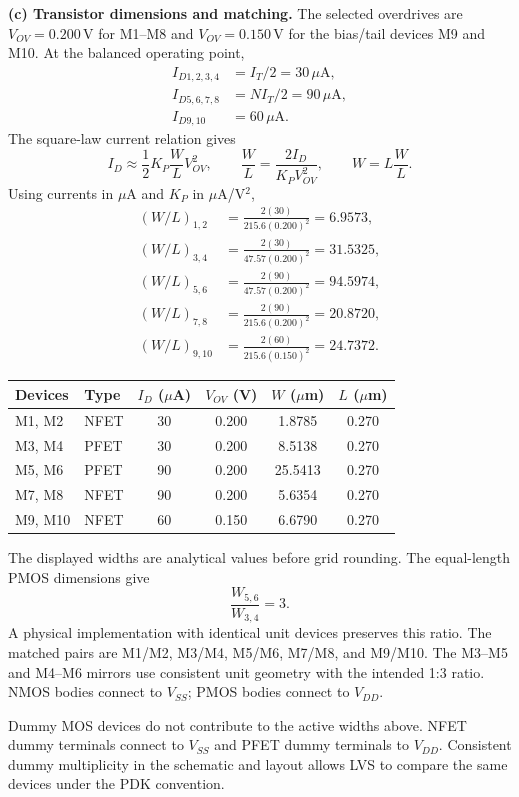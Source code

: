 \documentclass[12pt,letterpaper]{article}
\newcommand{\uA}{\,\mu\mathrm{A}}
\newcommand{\V}{\,\mathrm{V}}
\begin{document}
\begin{enumerate}
\newpage
\textbf{(c) Transistor dimensions and matching.}
The selected overdrives are $V_{OV}=0.200\V$ for M1--M8 and
$V_{OV}=0.150\V$ for the bias/tail devices M9 and M10.
At the balanced operating point,
\begin{align*}
I_{D1,2,3,4}&=I_T/2=30\uA,\\
I_{D5,6,7,8}&=NI_T/2=90\uA,\\
I_{D9,10}&=60\uA.
\end{align*}
The square-law current relation gives
\[
I_D\approx\frac12 K_P\frac WL V_{OV}^2,\qquad
\frac WL=\frac{2I_D}{K_PV_{OV}^2},\qquad W=L\frac WL.
\]
Using currents in $\mu$A and $K_P$ in $\mu$A/V$^2$,
\begin{align*}
(W/L)_{1,2}&=\frac{2(30)}{215.6(0.200)^2}=6.9573,\\
(W/L)_{3,4}&=\frac{2(30)}{47.57(0.200)^2}=31.5325,\\
(W/L)_{5,6}&=\frac{2(90)}{47.57(0.200)^2}=94.5974,\\
(W/L)_{7,8}&=\frac{2(90)}{215.6(0.200)^2}=20.8720,\\
(W/L)_{9,10}&=\frac{2(60)}{215.6(0.150)^2}=24.7372.
\end{align*}
\begin{center}
\small
\setlength{\tabcolsep}{5pt}
\begin{tabular}{@{}llcccc@{}}
\toprule
Devices & Type & $I_D$ ($\mu$A) & $V_{OV}$ (V) & $W$ ($\mu$m) & $L$ ($\mu$m)\\
\midrule
M1, M2 & NFET & 30 & 0.200 & 1.8785 & 0.270\\
M3, M4 & PFET & 30 & 0.200 & 8.5138 & 0.270\\
M5, M6 & PFET & 90 & 0.200 & 25.5413 & 0.270\\
M7, M8 & NFET & 90 & 0.200 & 5.6354 & 0.270\\
M9, M10 & NFET & 60 & 0.150 & 6.6790 & 0.270\\
\bottomrule
\end{tabular}
\end{center}
The displayed widths are analytical values before grid rounding.
The equal-length PMOS dimensions give
\[
\frac{W_{5,6}}{W_{3,4}}=3.
\]
A physical implementation with identical unit devices preserves
this ratio. The matched pairs are M1/M2, M3/M4, M5/M6, M7/M8,
and M9/M10. The M3--M5 and M4--M6 mirrors use consistent unit
geometry with the intended 1:3 ratio. NMOS bodies connect to
$V_{SS}$; PMOS bodies connect to $V_{DD}$.

Dummy MOS devices do not contribute to the active widths above.
NFET dummy terminals connect to $V_{SS}$ and PFET dummy terminals
to $V_{DD}$. Consistent dummy multiplicity in the schematic and
layout allows LVS to compare the same devices under the PDK
convention.


\end{enumerate}
\end{document}
